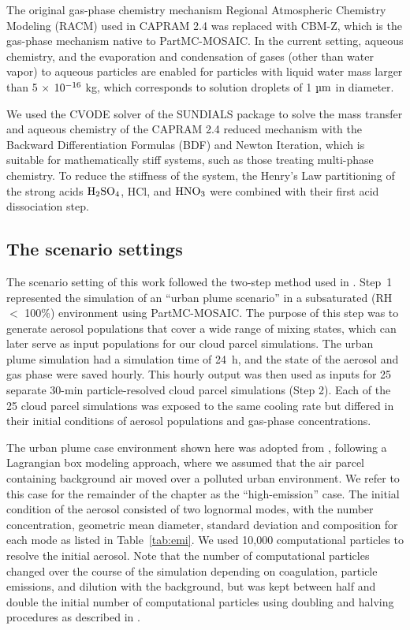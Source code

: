 \documentclass[edeposit,fullpage]{uiucthesis2009}
\begin{document}
The original gas-phase chemistry mechanism Regional Atmospheric
Chemistry Modeling (RACM) used in CAPRAM 2.4 was replaced with CBM-Z,
which is the gas-phase mechanism native to PartMC-MOSAIC. In the
current setting, aqueous chemistry, and the evaporation and
condensation of gases (other than water vapor) to aqueous particles
are enabled for particles with liquid water mass larger than 5
$\times$ $\rm 10^{-16}$ kg, which corresponds to solution droplets of
1 $\rm \mu m$ in diameter.

We used the CVODE \citep{Cohen1996} solver of the SUNDIALS
\citep{Hindmarsh2005} package to solve the mass transfer and aqueous
chemistry of the CAPRAM 2.4 reduced mechanism with the Backward
Differentiation Formulas (BDF) and Newton Iteration, which is suitable
for mathematically stiff systems, such as those treating multi-phase
chemistry.  To reduce the stiffness of the system, the Henry's Law
partitioning of the strong acids $\rm H_2SO_4$, HCl, and $\rm HNO_3$
were combined with their first acid dissociation step.

\subsection{The scenario settings}
The scenario setting of this work followed the two-step method
  used in \citet{ching2012impacts}. Step~1 represented the simulation of an
  ``urban plume scenario'' in a subsaturated (RH $<$ 100\%)
  environment using PartMC-MOSAIC. The purpose of this step was to
  generate aerosol populations that cover a wide range of mixing
  states, which can later serve as input populations for our cloud
  parcel simulations. The urban plume simulation had a simulation time
  of 24~h, and the state of the aerosol and gas phase were saved
  hourly. This hourly output was then used as inputs for 25 separate
  30-min particle-resolved cloud parcel simulations (Step 2). Each of
  the 25 cloud parcel simulations was exposed to the same cooling rate
  but differed in their initial conditions of aerosol populations and
  gas-phase concentrations.

The urban plume case environment shown here was adopted from
\citep{Zaveri2010a}, following a Lagrangian box modeling approach,
where we assumed that the air parcel containing background air moved
over a polluted urban environment. We refer to this case for the
remainder of the chapter as the ``high-emission'' case. The initial
condition of the aerosol consisted of two lognormal modes, with the
number concentration, geometric mean diameter, standard deviation and
composition for each mode as listed in Table~\ref{tab:emi}. We used
10,000 computational particles to resolve the initial aerosol. Note
that the number of computational particles changed over the course of
the simulation depending on coagulation, particle emissions, and
dilution with the background, but was kept between half and double the
initial number of computational particles using doubling and halving
procedures as described in \citet{Riemer2009}.
\end{document}
